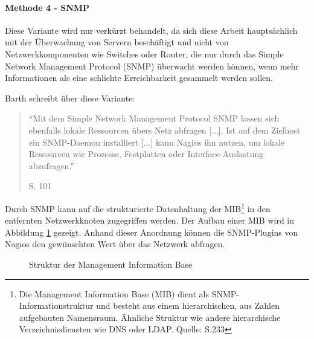 \paragraph{Methode 4 - SNMP}

Diese Variante wird nur verkürzt behandelt, da sich diese Arbeit hauptsächlich mit der Überwachung von Servern beschäftigt und nicht von Netzwerkkomponenten wie Switches oder Router, die nur durch das Simple Network Management Protocol (\gls{SNMP}) überwacht werden können, wenn mehr Informationen als eine schlichte Erreichbarkeit gesammelt werden sollen.

Barth schreibt über diese Variante:
\begin{quote}"`Mit dem Simple Network Management Protocol \gls{SNMP} lassen sich ebenfalls lokale Ressourcen übers Netz abfragen [...]. Ist auf dem Zielhost ein \gls{SNMP}-Daemon installiert [...] kann Nagios ihn nutzen, um lokale Ressourcen wie Prozesse, Festplatten oder Interface-Auslastung abzufragen."' \begin{flushright}\cite{Barth08} S. 101\end{flushright}\end{quote} 

Durch \gls{SNMP} kann auf die strukturierte Datenhaltung der \gls{MIB}\footnote{Die Management Information Base (\gls{MIB}) dient als \gls{SNMP}-Informationstruktur und besteht aus einem hierarchischen, aus Zahlen aufgebauten Namensraum. Ähnliche Struktur wie andere hierarchische Verzeichnisdiensten wie \gls{DNS} oder \gls{LDAP}. Quelle: \cite{Barth08} S.233} in den entfernten Netzwerkknoten zugegriffen werden.
Der Aufbau einer \gls{MIB} wird in Abbildung \ref{munin-mib} gezeigt.
Anhand dieser Anordnung können die \gls{SNMP}-Plugins von Nagios den gewünschten Wert über das Netzwerk abfragen.

\begin{figure}[ht]
	\centering
		\caption[Struktur der Management Information Base]{Struktur der Management Information Base\protect\footnotemark}
		\label{munin-mib}
\end{figure}

